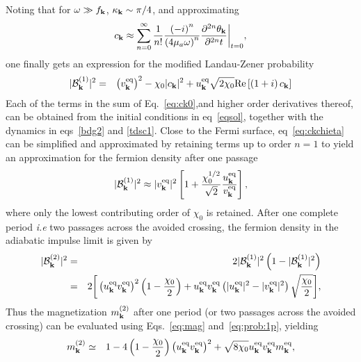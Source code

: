 \documentclass[a4paper,10pt]{report}
\begin{document}
{Noting that for $\omega \gg f_{\bf k}$, $\kappa_{\bf k} \sim
\pi/4$, and approximating}
\begin{equation}
\label{eq:ck0} c_{\bf k} \approx \sum^\infty_{n=0} \frac{1}{n!}
\frac{\left(-i\right)^n}{\left(4\mu_a\omega\right)^n}
\frac{\partial^{2n}\theta_{\bf k}}{\partial^{2n}t}\bigg|_{t=0},
\end{equation}
one finally gets an expression for the modified Landau-Zener
probability
\begin{eqnarray}
\label{eq:lz:pert} |\mathcal{B}^{(1)}_{\bf k}|^2 &=& \left(v^{\rm
eq}_{\bf k}\right)^2 -\chi_0|c_{\bf k}|^2+u^{\rm eq}_{\bf
k}\sqrt{2\chi_0}{\rm Re}\left[\left(1+i\right)c_{\bf k}\right]
\nonumber\\
\end{eqnarray}
Each of the terms in the sum of Eq.\ \ref{eq:ck0},and higher order derivatives thereof, can be obtained
from the initial conditions in eq\ \ref{eqsol}, together with the dynamics in eqs\ \ref{bdg2} and \ref{tdsc1}. Close to the Fermi surface,
eq\ \ref{eq:ckchieta} can be simplified and approximated by retaining terms up to order $n=1$ to yield an approximation for the fermion density after one passage
\begin{equation}
\label{eq:b1} |\mathcal{B}^{(1)}_{\bf k}|^2  \approx |v^{\rm
eq}_{\bf k}|^2\left[1+\frac{\chi^{1/2}_0}{\sqrt{2}}\frac{u^{\rm
eq}_{\bf k}}{v^{\rm eq}_{\bf k}}\right],
\end{equation}
where only the lowest contributing order of $\chi_0$ is retained. After one complete period
\textit{i.e} two passages across the avoided crossing, the fermion
density in the adiabatic impulse limit is given
by~\cite{review:lzstls}
\begin{eqnarray}
\label{eq:prob:1p}
 |\mathcal{B}^{(2)}_{\bf k}|^2 &=& 2 |\mathcal{B}^{(1)}_{\bf k}|^2
 \left(1-|\mathcal{B}^{(1)}_{\bf k}|^2\right)\nonumber \\
 &=&2\bigg[\left(u^{\rm eq}_{\bf k}v^{\rm eq}_{\bf k}\right)^2\left(1-\frac{\chi_0}{2}\right) +u^{\rm eq}_{\bf k}v^{\rm eq}_{\bf k}\left(|u^{\rm eq}_{\bf k}|^2-|v^{\rm eq}_{\bf k}|^2\right)\sqrt{\frac{\chi_0}{2}}\bigg],
\end{eqnarray}
Thus the magnetization $m_{\bf k}^{(2)}$ after
one period (or two passages across the avoided crossing) can be
evaluated using Eqs.\ \ref{eq:mag} and\ \ref{eq:prob:1p}, yielding
\begin{eqnarray}
\label{eq:m2:ex} m^{(2)}_{\bf k} &\simeq&
1-4\left(1-\frac{\chi_0}{2}\right) \left(u^{\rm eq}_{\bf k}v^{\rm
eq}_{\bf k}\right)^2 +\sqrt{8\chi_0} u^{\rm eq}_{\bf k}v^{\rm
eq}_{\bf k}m^{\rm eq}_{\bf k}, \nonumber\\
\end{eqnarray}
\end{document}
